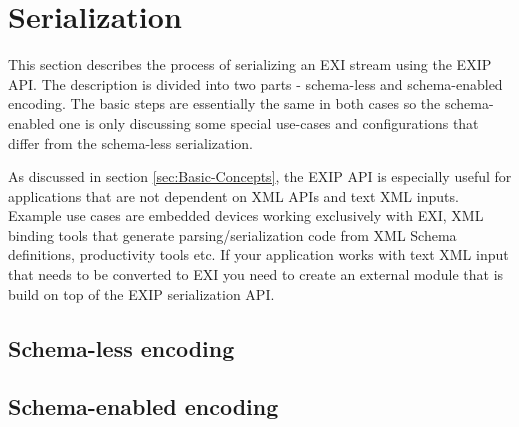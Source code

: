 \section{Serialization}

This section describes the process of serializing an EXI stream using the EXIP API.
The description is divided into two parts - schema-less and schema-enabled encoding.
The basic steps are essentially the same in both cases so the schema-enabled one is only
discussing some special use-cases and configurations that differ from the schema-less
serialization. 

As discussed in section \ref{sec:Basic-Concepts}, the EXIP API is especially useful
for applications that are not dependent on XML APIs and text XML inputs. Example
use cases are embedded devices working exclusively with EXI, XML binding tools
that generate parsing/serialization code from XML Schema definitions, productivity tools
etc. If your application works with text XML input that needs to be converted to EXI
you need to create an external module that is build on top of the EXIP serialization API.


\subsection{Schema-less encoding}

\subsection{Schema-enabled encoding}